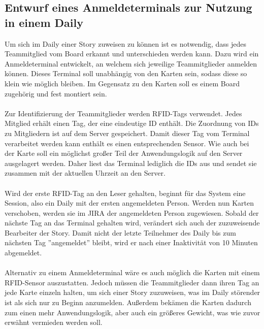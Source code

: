 \documentclass[12pt,titlepage]{scrartcl}
\begin{document}
		\subsection{Entwurf eines Anmeldeterminals zur Nutzung in einem Daily}
		Um sich im Daily einer Story zuweisen zu können ist es notwendig, dass jedes Teammitglied vom Board erkannt und unterschieden werden kann. Dazu wird ein Anmeldeterminal entwickelt, an welchem sich jeweilige Teammitglieder anmelden können. Dieses Terminal soll unabhängig von den Karten sein, sodass diese so klein wie möglich bleiben. Im Gegensatz zu den Karten soll es einem Board zugehörig und fest montiert sein. \\ \\
		Zur Identifizierung der Teammitglieder werden RFID-Tags verwendet. Jedes Mitglied erhält einen Tag, der eine eindeutige ID enthält. Die Zuordnung von IDs zu Mitgliedern ist auf dem Server gespeichert. Damit dieser Tag vom Terminal verarbeitet werden kann enthält es einen entsprechenden Sensor. Wie auch bei der Karte soll ein möglichst großer Teil der Anwendungslogik auf den Server ausgelagert werden. Daher liest das Terminal lediglich die IDs aus und sendet sie zusammen mit der aktuellen Uhrzeit an den Server. \\ \\
		Wird der erste RFID-Tag an den Leser gehalten, beginnt für das System eine Session, also ein Daily mit der ersten angemeldeten Person. Werden nun Karten verschoben, werden sie im JIRA der angemeldeten Person zugewiesen. Sobald der nächste Tag an das Terminal gehalten wird, verändert sich auch der zuzuweisende Bearbeiter der Story. Damit nicht der letzte Teilnehmer des Daily bis zum nächsten Tag ''angemeldet'' bleibt, wird er nach einer Inaktivität von 10 Minuten abgemeldet. \\ \\
		Alternativ zu einem Anmeldeterminal wäre es auch möglich die Karten mit einem RFID-Sensor auszustatten. Jedoch müssen die Teammitglieder dann ihren Tag an jede Karte einzeln halten, um sich einer Story zuzuweisen, was im Daily störender ist als sich nur zu Beginn anzumelden. Außerdem bekämen die Karten dadurch zum einen mehr Anwendungslogik, aber auch ein größeres Gewicht, was wie zuvor erwähnt vermieden werden soll. \\ 
\end{document}
